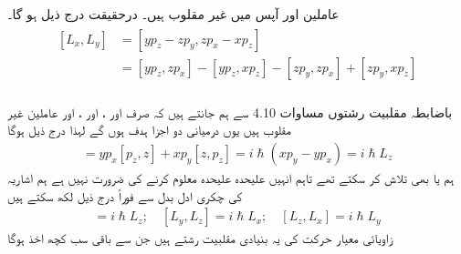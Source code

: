 عاملین  اور  آپس میں غیر مقلوب  ہیں۔ درحقیقت درج ذیل ہو گا۔
\begin{gather}
\begin{aligned}
[L_{x},L_{y}]&=[yp_{z}-zp_{y},zp_{x}-xp_{z}]\\
&=[yp_{z},zp_{x}]-[yp_{z},xp_{z}]-[zp_{y},zp_{x}]+[zp_{y},xp_{z}]\\
\end{aligned}
\end{gather}

باضابطہ مقلبیت رشتوں مساوات 4.10 سے ہم جانتے ہیں کہ صرف  اور ،   اور ،   اور  عاملین   غیر مقلوب ہیں یوں درمیانی دو اجزا ہدف ہوں گے لہذا درج ذیل ہوگا 
\begin{align}
[L_x, L_y] = y p_x [p_z, z] + x p_y [z, p_z] = i \hslash (x p_y - y p_x) = i \hslash L_z
\end{align}
ہم  یا  بھی تلاش کر سکتے تھے تاہم انہیں علیحدہ علیحدہ معلوم کرنے کی ضرورت نہیں ہے ہم اشاریہ کی چکری ادل بدل  سے فوراً درج ذیل لکھ سکتے ہیں 
\begin{align}
[L_x, L_y] = i \hslash L_z ; \quad [L_y, L_z] = i \hslash L_x ; \quad [L_z, L_x] = i \hslash L_y
\end{align}
زاویائی معیار حرکت کی یہ بنیادی مقلبیت رشتے ہیں جن سے باقی سب کچھ اخذ ہوگا

